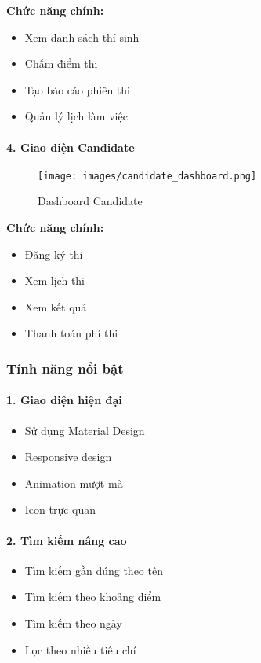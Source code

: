 \documentclass[12pt,a4paper]{article}
\begin{document}
\textbf{Chức năng chính:}
\begin{itemize}
    \item Xem danh sách thí sinh
    \item Chấm điểm thi
    \item Tạo báo cáo phiên thi
    \item Quản lý lịch làm việc
\end{itemize}

\paragraph{4. Giao diện Candidate}

\begin{figure}[H]
\centering
\texttt{[image: images/candidate\_dashboard.png]}
\caption{Dashboard Candidate}
\label{fig:candidate_dashboard}
\end{figure}

\textbf{Chức năng chính:}
\begin{itemize}
    \item Đăng ký thi
    \item Xem lịch thi
    \item Xem kết quả
    \item Thanh toán phí thi
\end{itemize}

\subsubsection{Tính năng nổi bật}

\paragraph{1. Giao diện hiện đại}
\begin{itemize}
    \item Sử dụng Material Design
    \item Responsive design
    \item Animation mượt mà
    \item Icon trực quan
\end{itemize}

\paragraph{2. Tìm kiếm nâng cao}
\begin{itemize}
    \item Tìm kiếm gần đúng theo tên
    \item Tìm kiếm theo khoảng điểm
    \item Tìm kiếm theo ngày
    \item Lọc theo nhiều tiêu chí
\end{itemize}
\end{document}
